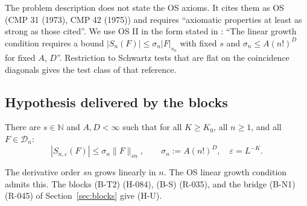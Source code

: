The problem description \cite{jaffewitten} does not state the OS axioms. It cites them as OS (CMP 31 (1973), CMP 42 (1975)) \cite{os1973,os1975} and requires ``axiomatic properties at least as strong as those cited''. We use OS II in the form stated in \cite{OAI26-O3}: ``The linear growth condition requires a bound $|S_n(F)|\le\sigma_n|F|_{s_n}$ with fixed $s$ and $\sigma_n\le A(n!)^D$ for fixed $A$, $D$''. Restriction to Schwartz tests that are flat on the coincidence diagonals gives the test class of that reference.

\subsection{Hypothesis delivered by the blocks}\label{sec:HU}
\begin{definition}\label{def:H116}
There are $s\in\mathbb N$ and $A,D<\infty$ such that for all $K\ge K_0$, all $n\ge1$, and all $F\in\mathcal D_n$:
\[|S_{n,\varepsilon}(F)|\le\sigma_n\|F\|_{sn},\qquad\sigma_n:=A(n!)^D,\quad\varepsilon=L^{-K}.\]
\end{definition}
The derivative order $sn$ grows linearly in $n$. The OS linear growth condition admits this. The blocks (B-T2) (H-084), (B-S) (R-035), and the bridge (B-N1) (R-045) of Section~\ref{sec:blocks} give (H-U).


